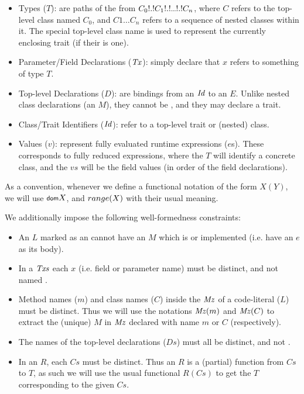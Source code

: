 \begin{itemize}
	\item Types ($T$): are paths of the from $C_0\.C_1\.\ldots\.C_n$, where $C$ refers to the top-level class named $C_0$, and $C1 \ldots C_n$ refers to a sequence of nested classes within it. The special top-level class name \This is used to represent the currently enclosing trait (if their is one). 

	\item Parameter/Field Declarations ($\mathit{Tx}$): simply declare that $x$ refers to something of type $T$.
	
	\item Top-level Declarations ($D$):  are bindings from an $\mathit{Id}$ to an $E$. Unlike nested class declarations (an $M$), they cannot be , and they may declare a trait. 

	\item Class/Trait Identifiers ($\mathit{Id}$): refer to a top-level trait or (nested) class.
	
	\item Values ($v$): represent fully evaluated runtime expressions ($e$s). These corresponds to fully reduced  expressions, where the $T$ will identify a concrete class, and the $vs$ will be the field values (in order of the field declarations).	
\end{itemize}

As a convention, whenever we define a functional notation of the form $X(Y)$, we will use $\dom{X}$, and ${\footnotesize{{range}}({X})}$ with their usual meaning.

We additionally impose the following well-formedness constraints:
\begin{itemize}
	\item An $L$ marked as an  cannot have an $M$ which is  or implemented (i.e. have an $e$ as its body).
	
	\item In a $\mathit{Txs}$ each $x$ (i.e. field or parameter name) must be distinct, and not named . 
	
	\item Method names ($m$) and class names ($C$) inside the $\mathit{Mz}$ of a code-literal ($L$) must be distinct. Thus we will use the notations $\mathit{Mz}(m)$ and $\mathit{Mz}(C)$ to extract the (unique) $M$ in $\mathit{Mz}$ declared with name $m$ or $C$ (respectively).
	
	\item The names of the top-level declarations ($Ds$) must all be distinct, and not \This.
	
	\item In an $R$, each $Cs$ must be distinct. Thus an $R$ is a (partial) function from $Cs$ to $T$, as such we will use the usual functional $R(Cs)$ to get the $T$ corresponding to the given $Cs$.
\end{itemize}


